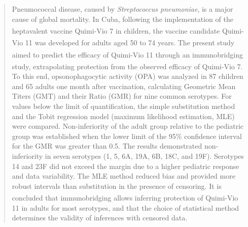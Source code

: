 \begin{abstract}
	Pneumococcal disease, caused by \textit{Streptococcus pneumoniae}, is a major cause of global mortality. In Cuba, following the implementation of the heptavalent vaccine Quimi-Vio\textsuperscript{\textregistered} 7 in children, the vaccine candidate Quimi-Vio\textsuperscript{\textregistered} 11 was developed for adults aged 50 to 74 years. The present study aimed to predict the efficacy of Quimi-Vio\textsuperscript{\textregistered} 11 through an immunobridging study, extrapolating protection from the observed efficacy of Quimi-Vio\textsuperscript{\textregistered} 7. To this end, opsonophagocytic activity (OPA) was analyzed in 87 children and 65 adults one month after vaccination, calculating Geometric Mean Titers (GMT) and their Ratio (GMR) for nine common serotypes. For values below the limit of quantification, the simple substitution method and the Tobit regression model (maximum likelihood estimation, MLE) were compared. Non-inferiority of the adult group relative to the pediatric group was established when the lower limit of the 95\% confidence interval for the GMR was greater than 0.5. The results demonstrated non-inferiority in seven serotypes (1, 5, 6A, 19A, 6B, 18C, and 19F). Serotypes 14 and 23F did not exceed the margin due to a higher pediatric response and data variability. The MLE method reduced bias and provided more robust intervals than substitution in the presence of censoring. It is concluded that immunobridging allows inferring protection of Quimi-Vio\textsuperscript{\textregistered} 11 in adults for most serotypes, and that the choice of statistical method determines the validity of inferences with censored data.
\end{abstract}